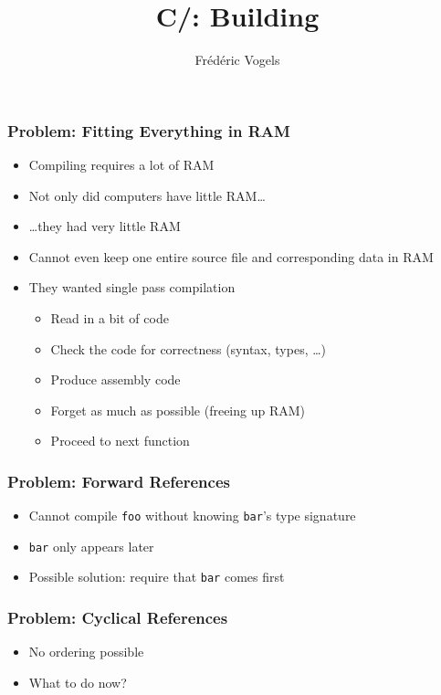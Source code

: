 \documentclass{../ucll-slides}
\title{C/\cpp: Building}
\author{Fr\'ed\'eric Vogels}
\begin{document}
\begin{frame}
  \titlepage
\end{frame}


\begin{frame}
  \frametitle{Problem: Fitting Everything in RAM}
  \begin{itemize}
    \item Compiling requires a lot of RAM
    \item Not only did computers have little RAM\dots
    \item \dots they had very little RAM
    \item Cannot even keep one entire source file and corresponding data in RAM
    \item They wanted single pass compilation
      \begin{itemize}
        \item Read in a bit of code
        \item Check the code for correctness (syntax, types, \dots)
        \item Produce assembly code
        \item Forget as much as possible (freeing up RAM)
        \item Proceed to next function
      \end{itemize}
  \end{itemize}
\end{frame}

\begin{frame}
  \frametitle{Problem: Forward References}
  \begin{itemize}
    \item Cannot compile {\tt foo} without knowing {\tt bar}'s type signature
    \item {\tt bar} only appears later
    \item Possible solution: require that {\tt bar} comes first
  \end{itemize}
\end{frame}

\begin{frame}
  \frametitle{Problem: Cyclical References}
  \begin{itemize}
    \item No ordering possible
    \item What to do now?
  \end{itemize}
\end{frame}
\end{document}
